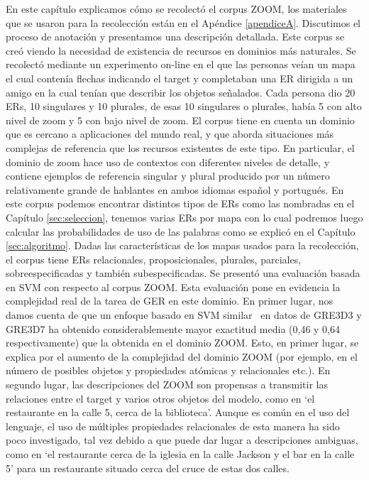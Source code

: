 En este cap\'itulo explicamos c\'omo se recolect\'o el corpus ZOOM, los materiales que se usaron para la recolecci\'on est\'an en el Ap\'endice \ref{apendiceA}. Discutimos el proceso de anotaci\'on y presentamos una descripci\'on detallada.
Este corpus se cre\'o viendo la necesidad de existencia de recursos en dominios m\'as naturales. Se recolect\'o mediante un experimento on-line en el que las personas ve\'ian un mapa el cual conten\'ia flechas indicando el target y completaban una ER dirigida a un amigo en la cual ten\'ian que describir los objetos se\~nalados. Cada persona dio 20 ERs, 10 singulares y 10 plurales, de esas 10 singulares o plurales, hab\'ia 5 con alto nivel de zoom y 5 con bajo nivel de zoom.
El corpus tiene en cuenta un dominio que es cercano a aplicaciones del mundo real, y que aborda situaciones m\'as complejas de referencia que los recursos existentes de este tipo. En particular, el dominio de zoom hace uso de contextos con diferentes niveles de detalle, y contiene ejemplos de referencia singular y plural producido por un n\'umero relativamente grande de hablantes en ambos idiomas espa\~nol y portugu\'es.
En este corpus podemos encontrar distintos tipos de ERs como las nombradas en el Cap\'itulo \ref{sec:seleccion}, tenemos varias ERs por mapa con lo cual podremos luego calcular las probabilidades de uso de las palabras como se explic\'o en el Cap\'itulo \ref{sec:algoritmo}. Dadas las caracter\'isticas de los mapas usados para la recolecci\'on, el corpus tiene ERs relacionales, proposicionales, plurales, parciales, sobreespecificadas y tambi\'en subespecificadas.
Se present\'o una evaluaci\'on basada en SVM con respecto al corpus ZOOM. Esta evaluaci\'on pone en evidencia la complejidad real de la tarea de GER en este dominio.
En primer lugar, nos damos cuenta de que un enfoque basado en SVM similar~\cite{thiago-svm} en datos de GRE3D3 y GRE3D7 ha obtenido considerablemente mayor exactitud media (0,46 y 0,64 respectivamente) que la obtenida en el dominio ZOOM. Esto, en primer lugar, se explica por el aumento de la complejidad del dominio ZOOM (por ejemplo, en el n\'umero de posibles objetos y propiedades at\'omicas y relacionales etc.). 
En segundo lugar, las descripciones del ZOOM son propensas a transmitir las relaciones entre el target y varios otros objetos del modelo, como en `el restaurante en la calle 5, cerca de la biblioteca'. Aunque es com\'un en el uso del lenguaje, el uso de m\'ultiples propiedades relacionales de esta manera ha sido poco investigado, tal vez debido a que puede dar lugar a descripciones ambiguas, como en `el restaurante cerca de la iglesia en la calle Jackson y el bar en la calle 5' para un restaurante situado cerca del cruce de estas dos calles.
